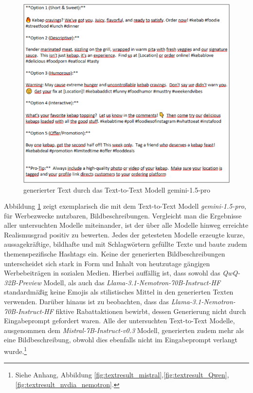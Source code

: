 \clearpage
\begin{figure}[htbp]
    \includegraphics[width=\textwidth, height=\textheight, keepaspectratio]{abbildungen/textresult_gemini}
    \caption{generierter Text durch das Text-to-Text Modell gemini-1.5-pro}
    \label{fig:textresult_gemini}
\end{figure}
Abbildung \ref{fig:textresult_gemini} zeigt exemplarisch die mit dem Text-to-Text Modell \textit{gemini-1.5-pro}, für Werbezwecke nutzbaren, Bildbeschreibungen.
Vergleicht man die Ergebnisse aller untersuchten Modelle miteinander, ist der über alle Modelle hinweg erreichte Realismusgrad positiv zu bewerten.
Jedes der getesteten Modelle erzeugte kurze, aussagekräftige, bildhafte und mit Schlagwörtern gefüllte Texte und baute zudem themenspezifische Hashtags ein.
Keine der generierten Bildbeschreibungen unterscheidet sich stark in Form und Inhalt von heutzutage gängigen Werbebeiträgen in sozialen Medien.
Hierbei auffällig ist, dass sowohl das \textit{QwQ-32B-Preview} Modell, als auch das \textit{Llama-3.1-Nemotron-70B-Instruct-HF} standardmäßig keine Emojis als stilistisches Mittel in den generierten Texten verwenden.
Darüber hinaus ist zu beobachten, dass das \textit{Llama-3.1-Nemotron-70B-Instruct-HF} fiktive Rabattaktionen bewirbt, dessen Generierung nicht durch Eingabeprompt gefordert waren.
Alle der untersuchten Text-to-Text Modelle, ausgenommen dem \textit{Mistral-7B-Instruct-v0.3} Modell, generierten zudem mehr als eine Bildbeschreibung, obwohl dies ebenfalls nicht im Eingabeprompt verlangt wurde.\footnote{Siehe Anhang, Abbildung \ref{fig:textresult_mistral},\ref{fig:textresult_Qwen},\ref{fig:textresult_nvdia_nemotron}.}

